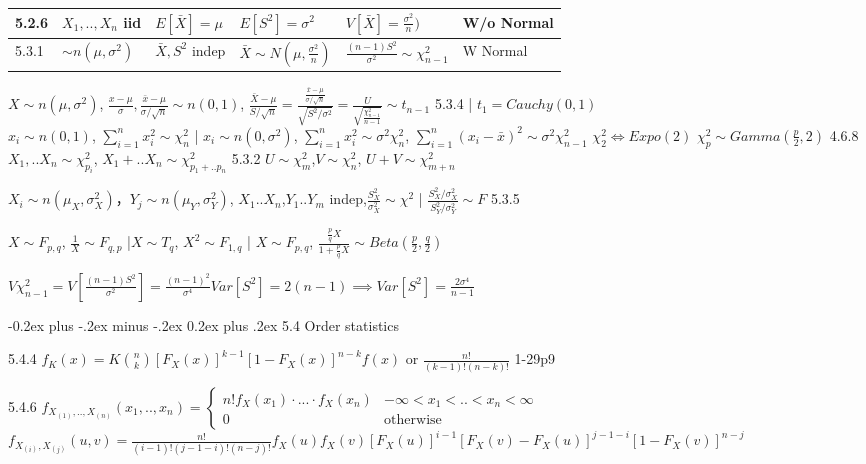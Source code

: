 \documentclass[10pt,landscape]{article}
\makeatletter
\renewcommand{\subsection}{\@startsection{subsection}{2}{0mm}%
                                {-0.2ex plus -.2ex minus -.2ex}%
                                {0.2ex plus .2ex}%
                                {\normalfont\normalsize\bfseries}}
\makeatother
\begin{document}
\begin{multicols}{1}
\begin{tabular}{ll|l|l|l|l}
5.2.6 & $X_1,..,X_n$ iid  & $E[\bar X]=\mu$ & $E[S^2]=\sigma^2$ & $V[\bar X]=\frac{\sigma^2}n)$ & W/o Normal\\\hline
5.3.1 & $\sim n(\mu,\sigma^2)$ & $\bar X,S^2$ indep & $\bar X\sim N(\mu,\frac{\sigma^2}n)$ & $\frac{(n-1)S^2}{\sigma^2}\sim\chi^2_{n-1}$ & W  Normal\\
\end{tabular}

$X\sim n(\mu,\sigma^2)$, $\frac{x-\mu}{\sigma},\frac{\bar x-\mu}{\sigma/\sqrt{n}}\sim n(0,1)$, $\frac{\bar X-\mu}{S/\sqrt{n}}=\frac{\frac{\bar x-\mu}{\sigma/\sqrt{n}}}{\sqrt{S^2/\sigma^2}}=\frac{U}{\sqrt{\frac{\chi^2_{n-1}}{n-1}}}\sim t_{n-1}$ 5.3.4 | $t_1=Cauchy(0,1)$\\
$x_i\sim n(0,1)$, $\sum_{i=1}^nx_i^2\sim \chi^2_n$ | $x_i\sim n(0,\sigma^2)$, $\sum_{i=1}^nx_i^2\sim \sigma^2\chi^2_n$, $\sum_{i=1}^n(x_i-\bar x)^2\sim \sigma^2\chi^2_{n-1}$
$\chi^2_{2}\Leftrightarrow Expo(2)$ $\chi^2_{p}\sim Gamma(\frac{p}2,2)$ 4.6.8\\
$X_1,..X_n\sim \chi^2_{p_i}$, $X_1+..X_n\sim \chi^2_{p_1+..p_n}$ 5.3.2 
$U\sim \chi^2_{m}$,$V\sim \chi^2_{n}$, $U+V\sim \chi^2_{m+n}$

$X_i\sim n(\mu_X,\sigma_X^2)$，$Y_j\sim n(\mu_Y,\sigma_Y^2)$, $X_1..X_n$,$Y_1..Y_m$ indep,$\frac{S_X^2}{\sigma_X^2}\sim \chi^2$ | $\frac{S_X^2/\sigma_X^2}{S_Y^2/\sigma_Y^2} \sim F$ 5.3.5

$X\sim F_{p,q}$, $\frac{1}X \sim F_{q,p}$ |$X\sim T_q$, $X^2 \sim F_{1,q}$ | $X\sim F_{p,q}$, $\frac{\frac{p}{q}X}{1+\frac{p}{q}X} \sim Beta(\frac{p}2,\frac{q}2)$


$V\chi^2_{n-1}=V[\frac{(n-1)S^2}{\sigma^2}]=\frac{(n-1)^2}{\sigma^4}Var[S^2]=2(n-1)\implies Var[S^2]=\frac{2\sigma^4}{n-1}$

\subsection{5.4 Order statistics}

5.4.4 $f_{K}(x)=K\binom{n}{k}[F_X(x)]^{k-1}[1-F_X(x)]^{n-k}f(x)$ or $\frac{n!}{(k-1)!(n-k)!}$ 1-29p9

5.4.6 $f_{X_{(1)},..,X_{(n)}}(x_1,..,x_n)=\begin{cases}n!f_X(x_1)\cdot...\cdot f_X(x_n) &-\infty<x_1<..<x_n<\infty\\0&\text{otherwise}\end{cases}$ $f_{X_{(i)},X_{(j)}}(u,v)=\frac{n!}{(i-1)!(j-1-i)!(n-j)!}f_X(u)f_X(v)[F_X(u)]^{i-1}[F_X(v)-F_X(u)]^{j-1-i}[1-F_X(v)]^{n-j}$


\end{multicols}
\end{document}
